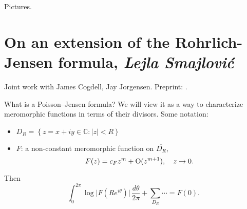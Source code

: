 \documentclass[reqno]{amsart} 
\begin{document}
Pictures.

\section{On an extension of the Rohrlich-Jensen formula, \textnormal{\emph{Lejla Smajlović}}}
Joint work with James Cogdell, Jay Jorgensen.  Preprint: \cite{2021arXiv2101.09599}.

What is a Poisson--Jensen formula?  We will view it as a way to characterize meromorphic functions in terms of their divisors.  Some notation:
\begin{itemize}
\item $D_R = \left\{ z = x + i y \in \mathbb{C} : \lvert z \rvert < R \right\}$
\item $F$: a non-constant meromorphic function on $\overline{D_R}$,
  \begin{equation*}
    F(z) = c_F z^m + \operatorname{O}(z^{m + 1}), \quad z \rightarrow 0.
  \end{equation*}
\end{itemize}
Then
\begin{equation*}
  \int_0^{2 \pi}
  \log \lvert F(R e^{i \theta}) \rvert
  \, \frac{d \theta}{2 \pi}
  + \sum _{D_R} \dotsb = F(0).
\end{equation*}
\end{document}
